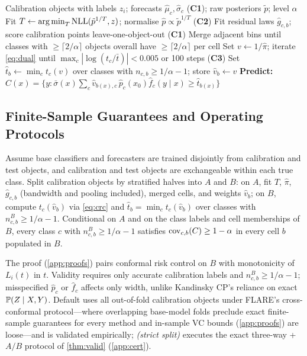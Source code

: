 \begin{algorithm}[t]
\caption{\gamut{} Calibration and Prediction}
\label{alg:gamut}
\begin{algorithmic}[1]
\REQUIRE Calibration objects with labels $z_i$; forecasts $\hat\mu_c,\hat\sigma_c$ (\textbf{C1}); raw posteriors $\tilde p$; level $\alpha$
\STATE Fit $T\gets\argmin_T \text{NLL}(\tilde p^{1/T}, z)$; normalise $\hat p\propto \tilde p^{1/T}$ \hfill (\textbf{C2})
\STATE Fit residual laws $\hat g_{c,b}$; score calibration points leave-one-object-out \hfill (\textbf{C1})
\STATE Merge adjacent bins until classes with $\ge\lceil2/\alpha\rceil$ objects overall have $\ge\lceil2/\alpha\rceil$ per cell
\STATE Set $v\gets 1/\hat\pi$; iterate \cref{eq:dual} until $\max_c|\log(t_c/\bar t)|<0.005$ or 100 steps \hfill (\textbf{C3})
\STATE Set $\hat t_b\gets\min_c t_c(v)$ over classes with $n_{c,b}\ge1/\alpha-1$; store $\hat v_b\gets v$
\ENDFOR
\STATE \textbf{Predict:} $C(x)=\big\{y:\bar\sigma(x)\sum_c \hat v_{b(x),c}\,\hat p_c(x_0)\hat f_c(y\mid x)\ge \hat t_{b(x)}\big\}$
\end{algorithmic}
\end{algorithm}

\subsection{Finite-Sample Guarantees and Operating Protocols}
\label{sec:theory}

\begin{theorem}
\label{thm:valid}
Assume base classifiers and forecasters are trained disjointly from calibration and test objects, and calibration and test objects are exchangeable within each true class.
Split calibration objects by stratified halves into $A$ and $B$: on $A$, fit $T$, $\hat\pi$, $\hat g_{c,b}$ (bandwidth and pooling included), merged cells, and weights $\hat v_b$; on $B$, compute $t_c(\hat v_b)$ via \cref{eq:crc} and $\hat t_b=\min_c t_c(\hat v_b)$ over classes with $n^B_{c,b}\ge 1/\alpha-1$.
Conditional on $A$ and on the class labels and cell memberships of $B$, every class $c$ with $n^B_{c,b}\ge1/\alpha-1$ satisfies $\cov_{c,b}(C)\ge1-\alpha$ in every cell $b$ populated in $B$.
\end{theorem}

The proof (\cref{app:proofs}) pairs conformal risk control on $B$ with monotonicity of $L_i(t)$ in $t$.
Validity requires only accurate calibration labels and $n^B_{c,b}\ge1/\alpha-1$; misspecified $\hat p_c$ or $\hat f_c$ affects only width, unlike Kandinsky CP's reliance on exact $\P(Z\mid X,Y)$.
Default \gamut{} uses all out-of-fold calibration objects under FLARE's cross-conformal protocol---where overlapping base-model folds preclude exact finite-sample guarantees for every method \citep{barber2021predictive} and in-sample VC bounds (\cref{app:proofs}) are loose---and is validated empirically; \emph{\gamut{} (strict split)} executes the exact three-way + $A/B$ protocol of \cref{thm:valid} (\cref{app:cert}).
